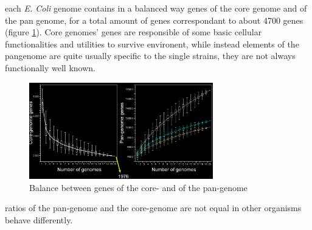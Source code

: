 each \emph{E. Coli} genome contains in a balanced way genes of the core genome and of the pan genome, for a total amount of genes correspondant to about 4700 genes (figure \ref{balancepancore}). Core genomes' genes are responsible of some basic cellular functionalities and utilities to survive environent, while instead elements of the pangenome are quite usually specific to the single strains, they are not always functionally well known. 

\begin{figure}[h]
\caption{Balance between genes of the core- and of the pan-genome}\label{balancepancore}
\centering
\includegraphics[width=8cm]{corePanGenEcoli}
\end{figure}

ratios of the pan-genome and the core-genome are not equal in other
organisms behave differently.